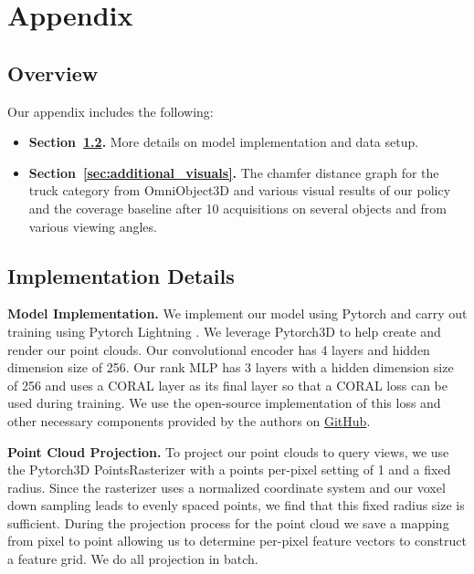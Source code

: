 \section{Appendix}
\label{sec:appendix}

\subsection{Overview}
\noindent Our appendix includes the following:
\begin{itemize}
  \item \textbf{Section~\ref{sec:implementation}.} More details on model implementation and data setup.
  \item \textbf{Section~\ref{sec:additional_visuals}.} The chamfer distance graph for the truck category from OmniObject3D \cite{wu2023omniobject3d} and various visual results of our policy and the coverage baseline after 10 acquisitions on several objects and from various viewing angles. 
\end{itemize}

\subsection{Implementation Details}
\label{sec:implementation}

\noindent\textbf{Model Implementation.} We implement our model using Pytorch \cite{paszke2019pytorchimperativestylehighperformance} 
and carry out training using Pytorch Lightning \cite{Falcon_PyTorch_Lightning_2019}.
We leverage Pytorch3D\cite{ravi2020pytorch3d} to help create and render our point clouds. Our convolutional encoder has 4 layers and hidden dimension size of 256. Our rank MLP has 3 layers with a hidden dimension size of 256 and uses a CORAL \cite{coral2020} layer as its final layer so that a CORAL loss can be used during training. We use the open-source implementation of this loss and other necessary components provided by the authors on \href{https://github.com/Raschka-research-group/coral-pytorch}{GitHub}.

\noindent\textbf{Point Cloud Projection.} To project our point clouds to query views, we use the Pytorch3D\cite{ravi2020pytorch3d} PointsRasterizer with a points per-pixel setting of 1 and a fixed radius. Since the rasterizer uses a normalized coordinate system and our voxel down sampling leads to evenly spaced points, we find that this fixed radius size is sufficient. During the projection process for the point cloud we save a mapping from pixel to point allowing us to determine per-pixel feature vectors to construct a feature grid. We do all projection in batch.

